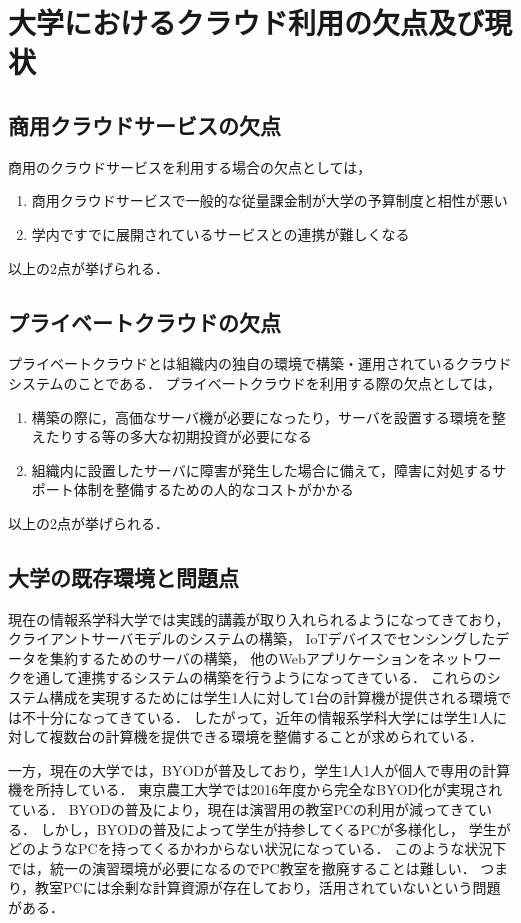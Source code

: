 \documentclass[10pt,a4paper]{jsarticle}
\begin{document}
\section{大学におけるクラウド利用の欠点及び現状}
\subsection{商用クラウドサービスの欠点}
商用のクラウドサービスを利用する場合の欠点としては，
\begin{enumerate}
	\item 商用クラウドサービスで一般的な従量課金制が大学の予算制度と相性が悪い
	\item 学内ですでに展開されているサービスとの連携が難しくなる
\end{enumerate}
以上の2点が挙げられる．
\subsection{プライベートクラウドの欠点}
プライベートクラウドとは組織内の独自の環境で構築・運用されているクラウドシステムのことである．
プライベートクラウドを利用する際の欠点としては，
\begin{enumerate}
	\item 構築の際に，高価なサーバ機が必要になったり，サーバを設置する環境を整えたりする等の多大な初期投資が必要になる
	\item 組織内に設置したサーバに障害が発生した場合に備えて，障害に対処するサポート体制を整備するための人的なコストがかかる
\end{enumerate}
以上の2点が挙げられる．

\subsection{大学の既存環境と問題点}
現在の情報系学科大学では実践的講義が取り入れられるようになってきており，
クライアントサーバモデルのシステムの構築，
IoTデバイスでセンシングしたデータを集約するためのサーバの構築，
他のWebアプリケーションをネットワークを通して連携するシステムの構築を行うようになってきている．
これらのシステム構成を実現するためには学生1人に対して1台の計算機が提供される環境では不十分になってきている．
したがって，近年の情報系学科大学には学生1人に対して複数台の計算機を提供できる環境を整備することが求められている．
\par 一方，現在の大学では，BYODが普及しており，学生1人1人が個人で専用の計算機を所持している．
東京農工大学では2016年度から完全なBYOD化が実現されている\cite{nokodai}．
BYODの普及により，現在は演習用の教室PCの利用が減ってきている．
しかし，BYODの普及によって学生が持参してくるPCが多様化し，
学生がどのようなPCを持ってくるかわからない状況になっている．
このような状況下では，統一の演習環境が必要になるのでPC教室を撤廃することは難しい．
つまり，教室PCには余剰な計算資源が存在しており，活用されていないという問題がある．
\end{document}
